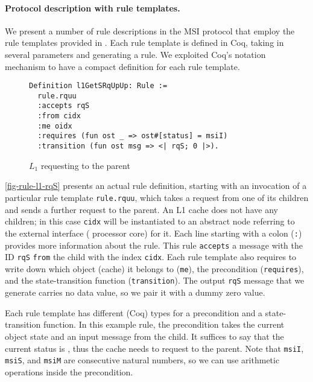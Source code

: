 \documentclass[sigplan,10pt,review,anonymous,screen]{acmart}\settopmatter{printfolios=true,printccs=false,printacmref=false}
\def\slstinline{\lstinline[basicstyle=\ttfamily\small]}
\begin{document}
\paragraph{Protocol description with rule templates.}

We present a number of rule descriptions in the MSI protocol that employ the rule templates provided in \hemiola{}.
Each rule template is defined in Coq, taking in several parameters and generating a rule.
We exploited Coq's notation mechanism to have a compact definition for each rule template.

\begin{figure}[h]
  \centering
\begin{lstlisting}
Definition l1GetSRqUpUp: Rule :=
  rule.rquu
  :accepts rqS
  :from cidx
  :me oidx
  :requires (fun ost _ => ost#[status] = msiI)
  :transition (fun ost msg => <| rqS; 0 |>).
\end{lstlisting}
  \caption{$L_1$ requesting \stS{} to the parent}
  \label{fig-rule-l1-rqS}
\end{figure}

\autoref{fig-rule-l1-rqS} presents an actual rule definition, starting with an invocation of a particular rule template \slstinline{rule.rquu}, which takes a request from one of its children and sends a further request to the parent.
An L1 cache does not have any children; in this case \slstinline{cidx} will be instantiated to an abstract node referring to the external interface (\ie{} processor core) for it.
Each line starting with a colon (\slstinline{:}) provides more information about the rule.
This rule \slstinline{accepts} a message with the ID \slstinline{rqS} \slstinline{from} the child with the index \slstinline{cidx}.
Each rule template also requires to write down which object (cache) it belongs to (\slstinline{me}), the precondition (\slstinline{requires}), and the state-transition function (\slstinline{transition}).
The output \slstinline{rqS} message that we generate carries no data value, so we pair it with a dummy zero value.

Each rule template has different (Coq) types for a precondition and a state-transition function.
In this example rule, the precondition takes the current object state and an input message from the child.
It suffices to say that the current status is \stI{}, thus the cache needs to request to the parent.
Note that \slstinline{msiI}, \slstinline{msiS}, and \slstinline{msiM} are consecutive natural numbers, so we can use arithmetic operations inside the precondition.
\end{document}
